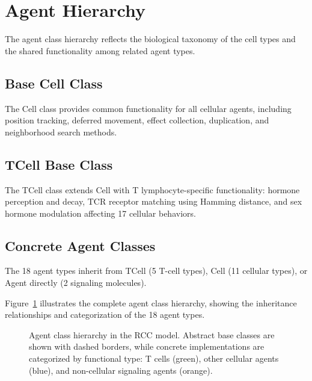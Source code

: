 \section{Agent Hierarchy}
\label{sec:md_hierarchy}

The agent class hierarchy reflects the biological taxonomy of the cell types and the shared functionality among related agent types.

\subsection{Base Cell Class}
\label{subsec:md_cell}

The Cell class provides common functionality for all cellular agents, including position tracking, deferred movement, effect collection, duplication, and neighborhood search methods.

\subsection{TCell Base Class}
\label{subsec:md_tcell}

The TCell class extends Cell with T lymphocyte-specific functionality: hormone perception and decay, TCR receptor matching using Hamming distance, and sex hormone modulation affecting 17 cellular behaviors.

\subsection{Concrete Agent Classes}
\label{subsec:md_concrete}

The 18 agent types inherit from TCell (5 T-cell types), Cell (11 cellular types), or Agent directly (2 signaling molecules).

Figure~\ref{fig:agent_hierarchy} illustrates the complete agent class hierarchy, showing the inheritance relationships and categorization of the 18 agent types.

\begin{figure}[htbp]
\centering
{}
\caption{Agent class hierarchy in the RCC model. Abstract base classes are shown with dashed borders, while concrete implementations are categorized by functional type: T cells (green), other cellular agents (blue), and non-cellular signaling agents (orange).}
\label{fig:agent_hierarchy}
\end{figure}

